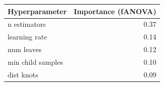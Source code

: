\begin{tabular}{lr}
\toprule
Hyperparameter & Importance (fANOVA) \\
\midrule
n estimators & 0.37 \\
learning rate & 0.14 \\
num leaves & 0.12 \\
min child samples & 0.10 \\
dist knots & 0.09 \\
\bottomrule
\end{tabular}
